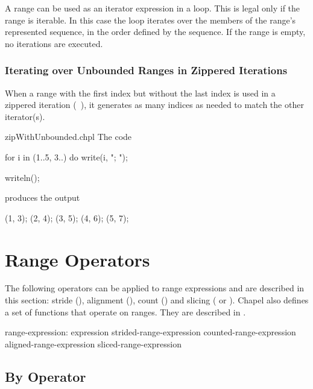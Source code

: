 A range can be used as an iterator expression in a loop. This is legal
only if the range is iterable. In this case the loop iterates over the
members of the range's represented sequence, in the order defined by
the sequence. If the range is empty, no iterations are executed.

\subsubsection{Iterating over Unbounded Ranges in Zippered Iterations}

When a range with the first index but without the last index is used
in a zippered iteration (~),
it generates as many indices as needed
to match the other iterator(s).

\begin{chapelexample}{zipWithUnbounded.chpl}
The code
\begin{chapel}
for i in (1..5, 3..) do
  write(i, "; ");
\end{chapel}
\begin{chapelpost}
writeln();
\end{chapelpost}
produces the output 
\begin{chapelprintoutput}
(1, 3); (2, 4); (3, 5); (4, 6); (5, 7); 
\end{chapelprintoutput}
\end{chapelexample}



\section{Range Operators}
\label{Range_Operators}

The following operators can be applied to range
expressions and are described in this section: stride (),
alignment (), count (\chpl{\#}) and slicing (\chpl{\(\)}
or \chpl{\[\]}).
Chapel also defines a set of functions that operate on ranges.
They are described in .

\begin{syntax}
range-expression:
  expression
  strided-range-expression
  counted-range-expression
  aligned-range-expression
  sliced-range-expression
\end{syntax}

\subsection{By Operator}
\label{By_Operator_For_Ranges}

